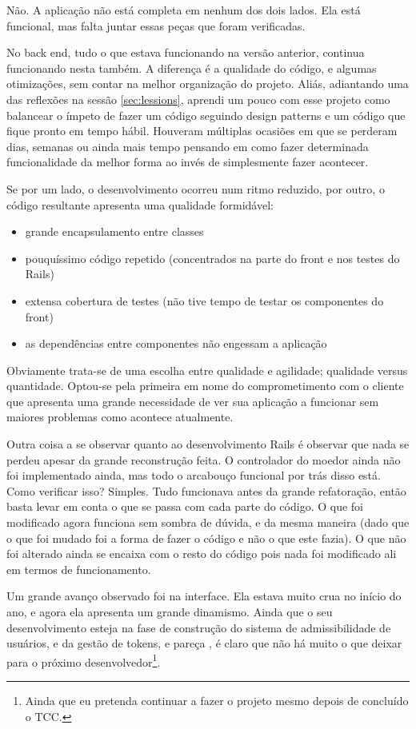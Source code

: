 Não. A aplicação não está completa em nenhum dos dois lados. Ela está funcional, mas falta juntar essas peças que foram
verificadas.

No back end, tudo o que estava funcionando  na versão anterior, continua funcionando nesta também. A diferença é a
qualidade do código, e algumas otimizações, sem contar na melhor organização do projeto. Aliás, adiantando uma das
reflexões na sessão \ref{sec:lessions}, aprendi um pouco com esse projeto como balancear o ímpeto de fazer um código
seguindo design patterns e um código que fique pronto em tempo hábil. Houveram múltiplas ocasiões em que se perderam dias,
semanas ou ainda mais tempo pensando em como fazer determinada funcionalidade da melhor forma ao invés de simplesmente
fazer acontecer.

Se por um lado, o desenvolvimento ocorreu num ritmo reduzido, por outro, o código resultante apresenta uma qualidade
formidável:
\begin{itemize}
    \item grande encapsulamento entre classes
    \item pouquíssimo código repetido (concentrados na parte do front e nos testes do Rails)
    \item extensa cobertura de testes (não tive tempo de testar os componentes do front)
    \item as dependências entre componentes não engessam a aplicação
\end{itemize}

Obviamente trata-se de uma escolha entre qualidade e agilidade; qualidade versus quantidade. Optou-se pela primeira em
nome do comprometimento com o cliente que apresenta uma grande necessidade de ver sua aplicação a funcionar sem maiores
problemas como acontece atualmente.

Outra coisa a se observar quanto ao desenvolvimento Rails é observar que nada se perdeu apesar da grande reconstrução
feita. O controlador do moedor ainda não foi implementado ainda, mas todo o arcabouço funcional por trás disso está.
Como verificar isso? Simples. Tudo funcionava antes da grande refatoração, então basta levar em conta o que se passa com
cada parte do código. O que foi modificado agora funciona sem sombra de dúvida, e da mesma maneira (dado que o que foi
mudado foi a forma de fazer o código e não o que este fazia). O que não foi alterado ainda se encaixa com o resto do
código pois nada foi modificado ali em termos de funcionamento.

Um grande avanço observado foi na interface. Ela estava muito crua no início do ano, e agora ela apresenta um grande
dinamismo. Ainda que o seu desenvolvimento esteja na fase de construção do sistema de admissibilidade de usuários, e da
gestão de tokens, e pareça , é claro que não há muito o que deixar para o próximo desenvolvedor\footnote{Ainda
que eu pretenda continuar a fazer o projeto mesmo depois de concluído o TCC.}.

